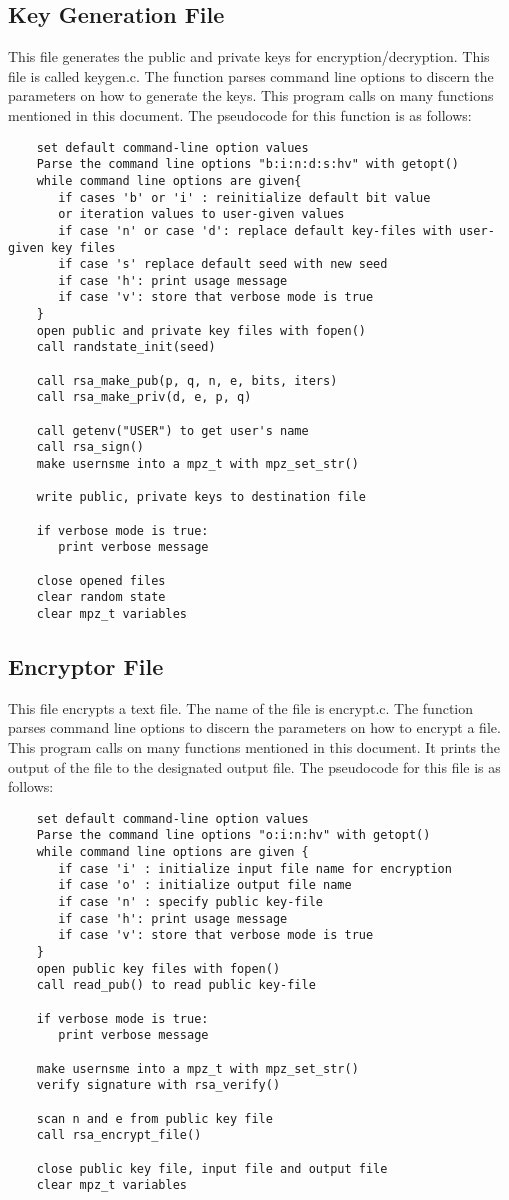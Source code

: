 \documentclass[11pt]{article}
\begin{document}
\subsection{Key Generation File}
This file generates the public and private keys for encryption/decryption. This file is called keygen.c. The function parses command line options to discern the parameters on how to generate the keys. This program calls on many functions mentioned in this document. The pseudocode for this function is as follows:
\begin{verbatim}
    set default command-line option values
    Parse the command line options "b:i:n:d:s:hv" with getopt()
    while command line options are given{
       if cases 'b' or 'i' : reinitialize default bit value
       or iteration values to user-given values
       if case 'n' or case 'd': replace default key-files with user-given key files
       if case 's' replace default seed with new seed
       if case 'h': print usage message
       if case 'v': store that verbose mode is true
    }
    open public and private key files with fopen()
    call randstate_init(seed)

    call rsa_make_pub(p, q, n, e, bits, iters)
    call rsa_make_priv(d, e, p, q)

    call getenv("USER") to get user's name
    call rsa_sign()
    make usernsme into a mpz_t with mpz_set_str()

    write public, private keys to destination file

    if verbose mode is true:
       print verbose message

    close opened files
    clear random state
    clear mpz_t variables
\end{verbatim}
\subsection{Encryptor File}
This file encrypts a text file. The name of the file is encrypt.c. The function parses command line options to discern the parameters on how to encrypt a file. This program calls on many functions mentioned in this document. It prints the output of the file to the designated output file. The pseudocode for this file is as follows:
\begin{verbatim}
    set default command-line option values
    Parse the command line options "o:i:n:hv" with getopt()
    while command line options are given {
       if case 'i' : initialize input file name for encryption
       if case 'o' : initialize output file name
       if case 'n' : specify public key-file
       if case 'h': print usage message
       if case 'v': store that verbose mode is true
    }
    open public key files with fopen()
    call read_pub() to read public key-file

    if verbose mode is true:
       print verbose message

    make usernsme into a mpz_t with mpz_set_str()
    verify signature with rsa_verify()

    scan n and e from public key file
    call rsa_encrypt_file()

    close public key file, input file and output file
    clear mpz_t variables
\end{verbatim}
\end{document}
